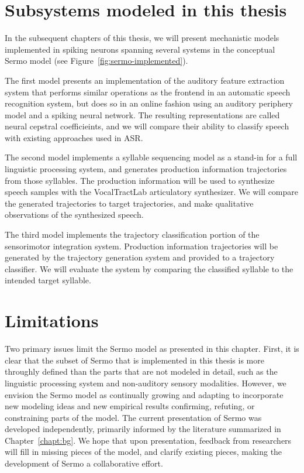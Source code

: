 \section{Subsystems modeled in this thesis}

In the subsequent chapters of this thesis,
we will present mechanistic models
implemented in spiking neurons
spanning several systems
in the conceptual Sermo model
(see Figure~\ref{fig:sermo-implemented}).


The first model presents an implementation
of the auditory feature extraction system
that performs similar operations as
the frontend in an automatic speech recognition system,
but does so in an online fashion
using an auditory periphery model
and a spiking neural network.
The resulting representations are called
neural cepstral coefficieints,
and we will compare their ability
to classify speech with
existing approaches used in ASR.

The second model implements
a syllable sequencing model
as a stand-in for a
full linguistic processing system,
and generates production information trajectories
from those syllables.
The production information will be
used to synthesize speech samples
with the VocalTractLab articulatory synthesizer.
We will compare the generated trajectories
to target trajectories,
and make qualitative observations
of the synthesized speech.

The third model implements
the trajectory classification portion
of the sensorimotor integration system.
Production information trajectories
will be generated
by the trajectory generation system
and provided to a trajectory classifier.
We will evaluate the system by
comparing the classified syllable
to the intended target syllable.

\section{Limitations}

Two primary issues limit the Sermo model
as presented in this chapter.
First, it is clear that the subset of Sermo
that is implemented in this thesis
is more throughly defined than
the parts that are not modeled in detail,
such as the linguistic processing system
and non-auditory sensory modalities.
However, we envision the Sermo model
as continually growing and adapting
to incorporate new modeling ideas
and new empirical results confirming,
refuting, or constraining parts of the model.
The current presentation of Sermo
was developed independently,
primarily informed by the literature
summarized in Chapter~\ref{chapt:bg}.
We hope that upon presentation,
feedback from researchers will
fill in missing pieces of the model,
and clarify existing pieces,
making the development of Sermo
a collaborative effort.

